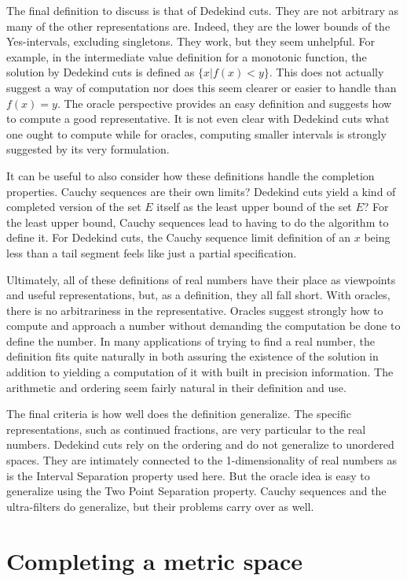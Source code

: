 \documentclass[12pt]{article}
\begin{document}
The final definition to discuss is that of Dedekind cuts. They are not arbitrary as many of the other representations are. Indeed, they are the lower bounds of the Yes-intervals, excluding singletons. They work, but they seem unhelpful. For example, in the intermediate value definition for a monotonic function, the solution by Dedekind cuts is defined as $\{x | f(x) < y\}$. This does not actually suggest a way of computation nor does this seem clearer or easier to handle than $f(x) = y$. The oracle perspective provides an easy definition and suggests how to compute a good representative. It is not even clear with Dedekind cuts what one ought to compute while for oracles, computing smaller intervals is strongly suggested by its very formulation. 

It can be useful to also consider how these definitions handle the completion properties. Cauchy sequences are their own limits? Dedekind cuts yield a kind of completed version of the set $E$ itself as the least upper bound of the set $E$? For the least upper bound, Cauchy sequences lead to having to do the algorithm to define it. For Dedekind cuts, the Cauchy sequence limit definition of an $x$ being less than a tail segment feels like just a partial specification. 

Ultimately, all of these definitions of real numbers have their place as viewpoints and useful representations, but, as a definition, they all fall short. With oracles, there is no arbitrariness in the representative. Oracles suggest strongly how to compute and approach a number without demanding the computation be done to define the number. In many applications of trying to find a real number, the definition fits quite naturally in both assuring the existence of the solution in addition to yielding a computation of it with built in precision information. The arithmetic and ordering seem fairly natural in their definition and use. 

The final criteria is how well does the definition generalize. The specific representations, such as continued fractions, are very particular to the real numbers. Dedekind cuts rely on the ordering and do not generalize to unordered spaces. They are intimately connected to the 1-dimensionality of real numbers as is the Interval Separation property used here. But the oracle idea is easy to generalize using the Two Point Separation property. Cauchy sequences and the ultra-filters do generalize, but their problems carry over as well. 

\section{Completing a metric space}
\end{document}
